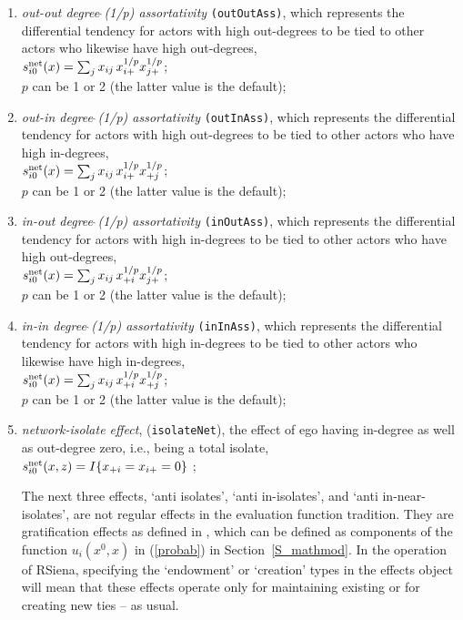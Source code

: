 \documentclass[a4paper,fleqn,11pt]{article}
\newcommand{\+}{\, + \,}
\newcommand{\rs}{{\sf RSiena}}
\newcommand{\vit}{\theenumi}
\newcounter{savenumi}
\begin{document}
\begin{enumerate}
 \item {\em out-out degree$\,\hat{\ }$(1/p) assortativity}
 \texttt{(outOutAss)},
 which represents the differential tendency for actors with high out-degrees
 to be tied to other actors who likewise have high out-degrees,\\
 $s^{\rm net}_{i\vit}(x) = \sum_j x_{ij}\, {x_{i+}^{1/p}} {x_{j+}^{1/p}} $;\\
 $p$ can be 1 or 2 (the latter value is the default);

 \item {\em out-in degree$\,\hat{\ }$(1/p) assortativity}
 \texttt{(outInAss)},
 which represents the differential tendency for actors with high out-degrees
 to be tied to other actors who have high in-degrees,\\
 $s^{\rm net}_{i\vit}(x) = \sum_j x_{ij}\, {x_{i+}^{1/p}} {x_{+j}^{1/p}} $;\\
 $p$ can be 1 or 2 (the latter value is the default);

 \item {\em in-out degree$\,\hat{\ }$(1/p) assortativity}
 \texttt{(inOutAss)},
 which represents the differential tendency for actors with high in-degrees
 to be tied to other actors who have high out-degrees,\\
 $s^{\rm net}_{i\vit}(x) = \sum_j x_{ij}\, {x_{+i}^{1/p}} {x_{j+}^{1/p}} $;\\
 $p$ can be 1 or 2 (the latter value is the default);

 \item {\em in-in degree$\,\hat{\ }$(1/p) assortativity}
 \texttt{(inInAss)},
 which represents the differential tendency for actors with high in-degrees
 to be tied to other actors who likewise have high in-degrees,\\
 $s^{\rm net}_{i\vit}(x) = \sum_j x_{ij}\, {x_{+i}^{1/p}} {x_{+j}^{1/p}} $;\\
 $p$ can be 1 or 2 (the latter value is the default);

\item \emph{network-isolate effect}, (\texttt{isolateNet}), the effect of ego having
      in-degree as well as out-degree zero, i.e., being a total isolate,\\
 $s^{\rm net}_{i\vit}(x, z) =   I\{x_{+i} = x_{i+} = 0 \}  $ ;


\iffalse
The next three effects, `anti isolates', `anti in-isolates',
and `anti in-near-isolates',
are not regular effects in the evaluation function tradition.
They are gratification effects as defined in \citet{Snijders01},
which can be defined as components of the function $u_i(x^0, x)$ in
(\ref{probab}) in Section~\ref{S_mathmod}.
In the operation of \rs, specifying the `endowment' or `creation'
types in the effects object will mean that these effects operate
only for maintaining existing or for creating new ties -- as usual.


\end{enumerate}
\end{document}
